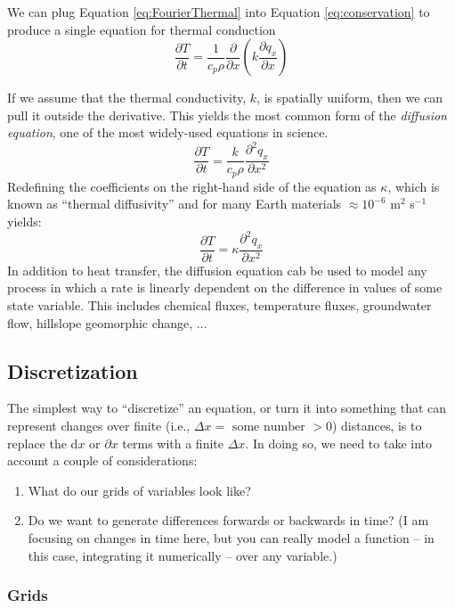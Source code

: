 \documentclass[a4paper,10pt]{scrartcl}
\begin{document}
We can plug Equation \ref{eq:FourierThermal} into Equation \ref{eq:conservation} to produce a single equation for thermal conduction
\begin{equation}
 \frac{\partial T}{\partial t} = \frac{1}{c_p \rho} \frac{\partial}{\partial x} \left( k \frac{\partial q_x}{\partial x} \right)
\end{equation}


If we assume that the thermal conductivity, $k$, is spatially uniform, then we can pull it outside the derivative. This yields the most common form of the \emph{diffusion equation}, one of the most widely-used equations in science.
\begin{equation}
 \frac{\partial T}{\partial t} = \frac{k}{c_p \rho} \frac{\partial^2 q_x}{\partial x^2}
\end{equation}
Redefining the coefficients on the right-hand side of the equation as $\kappa$, which is known as ``thermal diffusivity'' and for many Earth materials $\approx 10^{-6}$ m$^2$ s$^{-1}$ yields:
\begin{equation}
 \frac{\partial T}{\partial t} = \kappa \frac{\partial^2 q_x}{\partial x^2}
\end{equation}
In addition to heat transfer, the diffusion equation cab be used to model any process in which a rate is linearly dependent on the difference in values of some state variable. This includes chemical fluxes, temperature fluxes, groundwater flow, hillslope geomorphic change, ...

\subsection{Discretization}

The simplest way to ``discretize'' an equation, or turn it into something that can represent changes over finite (i.e., $\Delta x = \text{ some number } > 0$) distances, is to replace the d$x$ or $\partial x$ terms with a finite $\Delta x$. In doing so, we need to take into account a couple of considerations:
\begin{enumerate}
 \item What do our grids of variables look like?
 \item Do we want to generate differences forwards or backwards in time? (I am focusing on changes in time here, but you can really model a function -- in this case, integrating it numerically -- over any variable.)
\end{enumerate}

\subsubsection{Grids}
\end{document}
